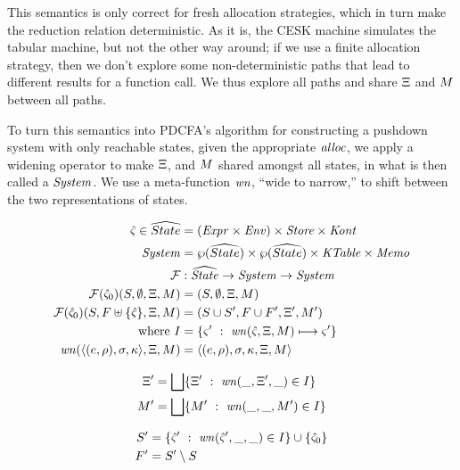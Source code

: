 This semantics is only correct for fresh allocation strategies, which in turn make the reduction relation deterministic.
%
As it is, the CESK machine simulates the tabular machine, but not the other way around;
%
if we use a finite allocation strategy, then we don't explore some non-deterministic paths that lead to different results for a function call.
%
We thus explore all paths and share $\Xi$ and $M$ between all paths.

To turn this semantics into PDCFA's algorithm for constructing a pushdown system with only reachable states, given the appropriate $\mathit{alloc}$, we apply a widening operator to make $\Xi$, and $M$ shared amongst all states, in what is then called a $\mathit{System}$. We use a meta-function $\mathit{wn}$, ``wide to narrow,'' to shift between the two representations of states.
%

{
\setlength{\abovedisplayskip}{0pt}
\setlength{\belowdisplayskip}{4pt}
\setlength{\abovedisplayshortskip}{0pt}
\setlength{\belowdisplayshortskip}{8pt}
\begin{align*}
  \hat\varsigma \in \widehat{State} &= (\mathit{Expr} \times \mathit{Env}) \times \mathit{Store} \times \mathit{Kont} \\
  \mathit{System} &= \wp(\widehat{State}) \times \wp(\widehat{State}) \times \mathit{KTable} \times \mathit{Memo} \\
  {\mathcal F} &: \widehat{\mathit{State}} \to \mathit{System} \to \mathit{System} \\
  {\mathcal F}(\hat\varsigma_0)(S, \emptyset, \Xi, M) &= (S, \emptyset, \Xi, M) \\
  {\mathcal F}(\hat\varsigma_0)(S, F\uplus\{ \hat\varsigma \}, \Xi, M) &= (S \cup S', F\cup F', \Xi', M') \\
  \text{where } I &= \{ \varsigma'\ :\ \mathit{wn}(\hat\varsigma,\Xi,M) \longmapsto \varsigma'\} \\
                \mathit{wn}(\langle (e,\rho),\sigma,\kappa \rangle,\Xi,M)
                   &= \langle (e,\rho),\sigma,\kappa,\Xi,M \rangle
\end{align*}
\begin{minipage}{.55\linewidth}
  \begin{align*}
    \Xi' &=  \bigsqcup\{ \Xi'\ :\ \mathit{wn}(\_, \Xi', \_) \in I\} \\
    M' &= \bigsqcup\{ M'\ :\ \mathit{wn}(\_, \_, M') \in I\}
  \end{align*}
\end{minipage}
\begin{minipage}{.40\linewidth}
  \begin{align*}
    S' &= \{ \hat\varsigma'\ :\ \mathit{wn}(\hat\varsigma', \_, \_) \in I\} \cup \{ \hat\varsigma_0 \}\\
    F' &= S' \setminus S
  \end{align*}
\end{minipage}
}

